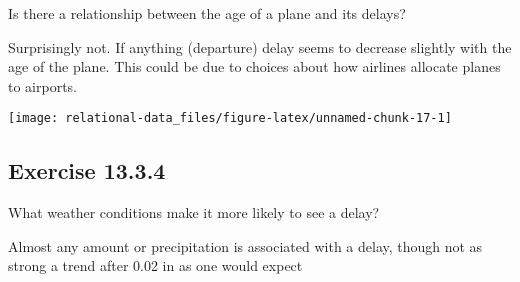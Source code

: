 \documentclass[]{book}
\newenvironment{Shaded}{\begin{snugshade}}{\end{snugshade}}
\newcommand{\CommentTok}[1]{\textcolor[rgb]{0.56,0.35,0.01}{\textit{#1}}}
\newcommand{\DataTypeTok}[1]{\textcolor[rgb]{0.13,0.29,0.53}{#1}}
\newcommand{\DecValTok}[1]{\textcolor[rgb]{0.00,0.00,0.81}{#1}}
\newcommand{\KeywordTok}[1]{\textcolor[rgb]{0.13,0.29,0.53}{\textbf{#1}}}
\newcommand{\NormalTok}[1]{#1}
\newcommand{\OperatorTok}[1]{\textcolor[rgb]{0.81,0.36,0.00}{\textbf{#1}}}
\newcommand{\StringTok}[1]{\textcolor[rgb]{0.31,0.60,0.02}{#1}}
\theoremstyle{plain}
\theoremstyle{remark}
\begin{document}
Is there a relationship between the age of a plane and its delays?

Surprisingly not. If anything (departure) delay seems to decrease
slightly with the age of the plane. This could be due to choices about
how airlines allocate planes to airports.

\begin{Shaded}
\end{Shaded}

\begin{center}\texttt{[image: relational-data\_files/figure-latex/unnamed-chunk-17-1]} \end{center}

\hypertarget{exercise-13.3.4}{%
\subsection*{\texorpdfstring{Exercise
{13.3.4}}{Exercise 13.3.4}}\label{exercise-13.3.4}}

What weather conditions make it more likely to see a delay?

Almost any amount or precipitation is associated with a delay, though
not as strong a trend after 0.02 in as one would expect
\end{document}
